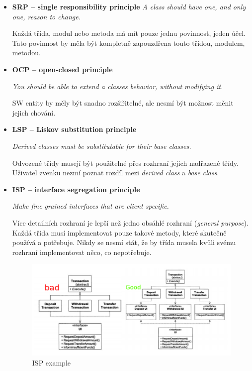 \documentclass{szzclass}
\begin{document}
\begin{itemize}
      \item \textbf{SRP -- single responsibility principle}
      \textit{A class should have one, and only one, reason to change.}

      Každá třída, modul nebo metoda má mít pouze jednu povinnost, jeden účel.
      Tato povinnost by měla být kompletně zapouzdřena touto třídou, modulem, metodou.

      \item \textbf{OCP -- open-closed principle}

      \textit{You should be able to extend a classes behavior, without modifying it.}

      SW entity by měly být snadno rozšiřitelné, ale nesmí být možnost měnit jejich chování.

      \item \textbf{LSP -- Liskov substitution principle}

      \textit{Derived classes must be substitutable for their base classes.}

      Odvozené třídy musejí být použitelné přes rozhraní jejich nadřazené třídy.
      Uživatel zvenku nezmí poznat rozdíl mezi \textit{derived class} a \textit{base class}.

      \item \textbf{ISP -- interface segregation principle}

      \textit{Make fine grained interfaces that are client specific.}

      Více detailních rozhraní je lepší než jedno obsáhlé rozhraní (\textit{general purpose}).
      Každá třída musí implementovat pouze takové metody, které skutečně používá a potřebuje.
      Nikdy se nesmí stát, že by třída musela kvůli svému rozhraní implementovat něco, co nepotřebuje.
      \begin{figure}[ht]
            \centering
            \includegraphics[width=1\textwidth]{topics/bi-wsi-si-09/isp.png}
            \caption{ISP example}
      \end{figure}


\end{itemize}
\end{document}
